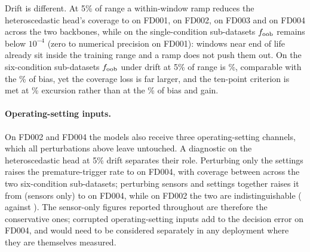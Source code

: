 \documentclass[journal]{IEEEtran}
\begin{document}
Drift is different. At 5\% of range a within-window ramp reduces the heteroscedastic head's coverage to \NDriftCovOne{} on FD001, \NDriftCovTwo{} on FD002, \NDriftCovThree{} on FD003 and \NDriftCovFour{} on FD004 across the two backbones, while on the single-condition sub-datasets $f_{\mathrm{oob}}$ remains below $10^{-4}$ (zero to numerical precision on FD001): windows near end of life already sit inside the training range and a ramp does not push them out. On the six-condition sub-datasets $f_{\mathrm{oob}}$ under drift at 5\% of range is \NDriftFoobSix\%, comparable with the \NBiasFoobSix\% of bias, yet the coverage loss is far larger, and the ten-point criterion is met at \NDriftHalfSix\% excursion rather than at the \NBGHalfSix\% of bias and gain.

\paragraph{Operating-setting inputs.} On FD002 and FD004 the models also receive three operating-setting channels, which all perturbations above leave untouched. A diagnostic on the heteroscedastic head at 5\% drift separates their role. Perturbing only the settings raises the premature-trigger rate to \NAOneFDfourSet{} on FD004, with coverage between \NAOneSetCov{} across the two six-condition sub-datasets; perturbing sensors and settings together raises it from \NAOneFDfourSens{} (sensors only) to \NAOneFDfourJoint{} on FD004, while on FD002 the two are indistinguishable (\NAOneFDtwoSens{} against \NAOneFDtwoJoint). The sensor-only figures reported throughout are therefore the conservative ones; corrupted operating-setting inputs add to the decision error on FD004, and would need to be considered separately in any deployment where they are themselves measured.
\end{document}
